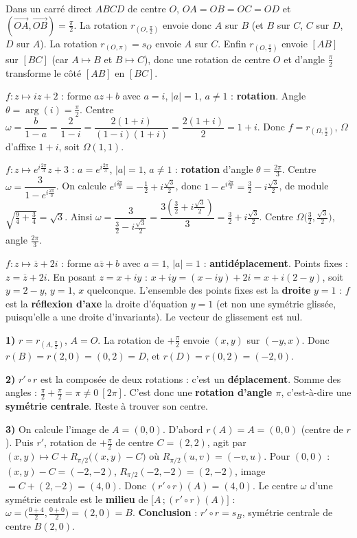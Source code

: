 Dans un carré direct $ABCD$ de centre $O$, $OA=OB=OC=OD$ et $(\overrightarrow{OA},\overrightarrow{OB})=\frac\pi2$. La rotation $r_{(O,\frac\pi2)}$ envoie donc $A$ sur $B$ (et $B$ sur $C$, $C$ sur $D$, $D$ sur $A$). La rotation $r_{(O,\pi)}=s_O$ envoie $A$ sur $C$. Enfin $r_{(O,\frac\pi2)}$ envoie $[AB]$ sur $[BC]$ (car $A\mapsto B$ et $B\mapsto C$), donc une rotation de centre $O$ et d'angle $\frac\pi2$ transforme le côté $[AB]$ en $[BC]$.

$f:z\mapsto iz+2$ : forme $az+b$ avec $a=i$, $|a|=1$, $a\neq1$ : \textbf{rotation}. Angle $\theta=\arg(i)=\frac\pi2$. Centre $\omega=\dfrac{b}{1-a}=\dfrac{2}{1-i}=\dfrac{2(1+i)}{(1-i)(1+i)}=\dfrac{2(1+i)}{2}=1+i$. Donc $f=r_{(\Omega,\frac\pi2)}$, $\Omega$ d'affixe $1+i$, soit $\Omega(1,1)$.

$f:z\mapsto e^{i\frac{2\pi}{3}}z+3$ : $a=e^{i\frac{2\pi}3}$, $|a|=1$, $a\neq1$ : \textbf{rotation} d'angle $\theta=\frac{2\pi}3$. Centre $\omega=\dfrac{3}{1-e^{i\frac{2\pi}3}}$. On calcule $e^{i\frac{2\pi}3}=-\tfrac12+i\tfrac{\sqrt3}2$, donc $1-e^{i\frac{2\pi}3}=\tfrac32-i\tfrac{\sqrt3}2$, de module $\sqrt{\tfrac94+\tfrac34}=\sqrt3$. Ainsi $\omega=\dfrac{3}{\tfrac32-i\tfrac{\sqrt3}2}=\dfrac{3(\tfrac32+i\tfrac{\sqrt3}2)}{3}=\tfrac32+i\tfrac{\sqrt3}2$. Centre $\Omega\big(\tfrac32,\tfrac{\sqrt3}2\big)$, angle $\frac{2\pi}3$.

$f:z\mapsto\overline z+2i$ : forme $a\overline z+b$ avec $a=1$, $|a|=1$ : \textbf{antidéplacement}. Points fixes : $z=\overline z+2i$. En posant $z=x+iy$ : $x+iy=(x-iy)+2i=x+i(2-y)$, soit $y=2-y$, $y=1$, $x$ quelconque. L'ensemble des points fixes est la \textbf{droite} $y=1$ : $f$ est la \textbf{réflexion d'axe} la droite d'équation $y=1$ (et non une symétrie glissée, puisqu'elle a une droite d'invariants). Le vecteur de glissement est nul.

\textbf{1)} $r=r_{(A,\frac\pi2)}$, $A=O$. La rotation de $+\frac\pi2$ envoie $(x,y)$ sur $(-y,x)$. Donc $r(B)=r(2,0)=(0,2)=D$, et $r(D)=r(0,2)=(-2,0)$.

\textbf{2)} $r'\circ r$ est la composée de deux rotations : c'est un \textbf{déplacement}. Somme des angles : $\frac\pi2+\frac\pi2=\pi\neq0\ [2\pi]$. C'est donc une \textbf{rotation d'angle $\pi$}, c'est-à-dire une \textbf{symétrie centrale}. Reste à trouver son centre.

\textbf{3)} On calcule l'image de $A=(0,0)$. D'abord $r(A)=A=(0,0)$ (centre de $r$). Puis $r'$, rotation de $+\frac\pi2$ de centre $C=(2,2)$, agit par $(x,y)\mapsto C+R_{\pi/2}\big((x,y)-C\big)$ où $R_{\pi/2}(u,v)=(-v,u)$. Pour $(0,0)$ : $(x,y)-C=(-2,-2)$, $R_{\pi/2}(-2,-2)=(2,-2)$, image $=C+(2,-2)=(4,0)$. Donc $(r'\circ r)(A)=(4,0)$. Le centre $\omega$ d'une symétrie centrale est le \textbf{milieu} de $\big[A\,;(r'\circ r)(A)\big]$ : $\omega=\big(\tfrac{0+4}2,\tfrac{0+0}2\big)=(2,0)=B$. \textbf{Conclusion} : $r'\circ r=s_B$, symétrie centrale de centre $B(2,0)$.

